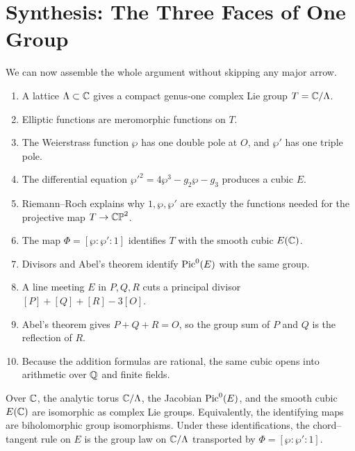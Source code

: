\chapter{Synthesis: The Three Faces of One Group}
\label{ch:synthesis}

We can now assemble the whole argument without skipping any major arrow.

\begin{center}
\resizebox{0.86\linewidth}{!}{\classicTrinityDiagram}
\end{center}

\begin{enumerate}
\item A lattice \(\Lambda\subset\mathbb{C}\) gives a compact genus-one complex Lie group
  \(T=\mathbb{C}/\Lambda\).
\item Elliptic functions are meromorphic functions on \(T\).
\item The Weierstrass function \(\wp\) has one double pole at \(O\), and
  \(\wp'\) has one triple pole.
\item The differential equation
  \(\wp'^2=4\wp^3-g_2\wp-g_3\) produces a cubic \(E\).
\item Riemann--Roch explains why \(1,\wp,\wp'\) are exactly the functions needed
  for the projective map \(T\to\mathbb{CP}^2\).
\item The map \(\Phi=[\wp:\wp':1]\) identifies \(T\) with the smooth cubic
  \(E(\mathbb{C})\).
\item Divisors and Abel's theorem identify \(\operatorname{Pic}^0(E)\) with the same group.
\item A line meeting \(E\) in \(P,Q,R\) cuts a principal divisor
  \([P]+[Q]+[R]-3[O]\).
\item Abel's theorem gives \(P+Q+R=O\), so the group sum of \(P\) and \(Q\) is
  the reflection of \(R\).
\item Because the addition formulas are rational, the same cubic opens into
  arithmetic over \(\mathbb{Q}\) and finite fields.
\end{enumerate}

\begin{theorem}
\label{thm:three-face}
Over \(\mathbb{C}\), the analytic torus \(\mathbb{C}/\Lambda\), the Jacobian \(\operatorname{Pic}^0(E)\), and
the smooth cubic \(E(\mathbb{C})\) are isomorphic as complex Lie groups.  Equivalently,
the identifying maps are biholomorphic group isomorphisms.  Under these
identifications, the chord--tangent rule on \(E\) is the group law on
\(\mathbb{C}/\Lambda\) transported by \(\Phi=[\wp:\wp':1]\).
\end{theorem}

